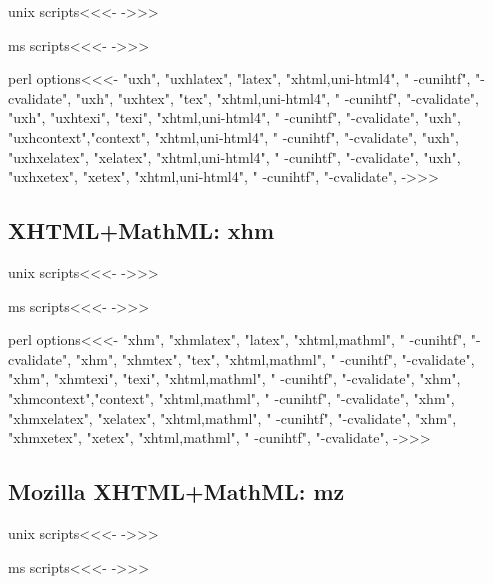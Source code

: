 \documentclass{article}
\begin{document}
\<unix scripts\><<<-
->>>

\<ms scripts\><<<-
->>>

\<perl options\><<<-
 "uxh", "uxhlatex",  "latex",   "xhtml,uni-html4", " -cunihtf", "-cvalidate",
 "uxh", "uxhtex",    "tex",     "xhtml,uni-html4", " -cunihtf", "-cvalidate",
 "uxh", "uxhtexi",   "texi",    "xhtml,uni-html4", " -cunihtf", "-cvalidate",
 "uxh", "uxhcontext","context",  "xhtml,uni-html4", " -cunihtf", "-cvalidate",
 "uxh", "uxhxelatex",  "xelatex",   "xhtml,uni-html4", " -cunihtf", "-cvalidate",
 "uxh", "uxhxetex",    "xetex",     "xhtml,uni-html4", " -cunihtf", "-cvalidate",
->>>

\subsection{XHTML+MathML: xhm}

\<unix scripts\><<<-
->>>

\<ms scripts\><<<-
->>>


\<perl options\><<<-
 "xhm", "xhmlatex", "latex",  "xhtml,mathml", " -cunihtf", "-cvalidate",
 "xhm", "xhmtex",   "tex",    "xhtml,mathml", " -cunihtf", "-cvalidate",
 "xhm", "xhmtexi",  "texi",   "xhtml,mathml", " -cunihtf", "-cvalidate",
 "xhm", "xhmcontext","context", "xhtml,mathml", " -cunihtf", "-cvalidate",
 "xhm", "xhmxelatex", "xelatex",  "xhtml,mathml", " -cunihtf", "-cvalidate",
 "xhm", "xhmxetex",   "xetex",    "xhtml,mathml", " -cunihtf", "-cvalidate",
->>>


\subsection{Mozilla XHTML+MathML: mz}

\<unix scripts\><<<-
->>>

\<ms scripts\><<<-
->>>
\end{document}
